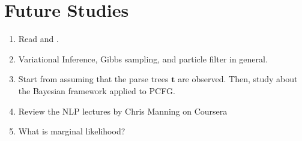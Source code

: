 \documentclass[11pt]{article}
\begin{document}
\section{Future Studies}
\begin{enumerate}
 \item Read \cite{beal2003variational} and \cite{kurihara2004application}.
 \item Variational Inference, Gibbs sampling, and particle filter in general.
 \item Start from assuming that the parse trees $\boldsymbol{t}$ are observed. Then, study about the Bayesian framework applied to PCFG.
 \item Review the NLP lectures by Chris Manning on Coursera
 \item What is marginal likelihood?
\end{enumerate}






\end{document}
